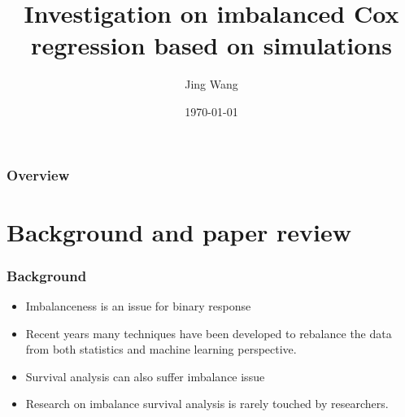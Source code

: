 \documentclass{beamer}
\title[Survival Analysis]{Investigation on imbalanced Cox regression based on simulations} %
\author{Jing Wang} %
\institute[UConn] %
{
	University of Connecticut \\ %
	\medskip
}
\date{\today} %
\begin{document}
	
	\begin{frame}
		\titlepage %
	\end{frame}
	
	\begin{frame}
		\frametitle{Overview} %
		\tableofcontents %
	\end{frame}
	
	
	\section{Background and paper review} %
	
	
	\begin{frame}
		\frametitle{Background}
		\begin{itemize}
		    \item Imbalanceness is an issue for binary response
            \item Recent years many techniques have been developed to rebalance the data from both statistics and machine learning perspective.
		\end{itemize}
        \begin{itemize}
            \item Survival analysis can also suffer imbalance issue
            \item Research on imbalance survival analysis is rarely touched by researchers.
        \end{itemize}
	\end{frame}
\end{document}
